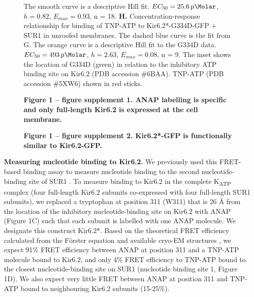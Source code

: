 \documentclass[10pt,lineno, doublespacing]{elife_modified}
\begin{document}
\begin{figure}
\begin{fullwidth}
{The smooth curve is a descriptive Hill fit.
$EC_{50} = \SI{25.6}{\micro\Molar}$, $h = 0.82$, $E_{max} = 0.93$, n = 18.
\textbf{H.}
Concentration-response relationship for binding of TNP-ATP to Kir6.2*-G334D-GFP + SUR1 in unroofed membranes.
The dashed blue curve is the fit from G. The orange curve is a descriptive Hill fit to the G334D data.
$EC_{50} = \SI{493}{\micro\Molar}$, $h = 2.63$, $E_{max} = 0.08$, n = 9.
The inset shows the location of G334D (green) in relation to the inhibitory ATP binding site on Kir6.2 (PDB accession \#6BAA).
TNP-ATP (PDB accession \#5XW6) shown in red sticks.
}
\raggedright
\textbf{\small Figure 1 -- figure supplement 1. ANAP labelling is specific and only full-length Kir6.2 is expressed at the cell membrane.}

\textbf{\small Figure 1 -- figure supplement 2. Kir6.2*-GFP is functionally similar to Kir6.2-GFP.}
\end{fullwidth}
\end{figure}

\textbf{Measuring nucleotide binding to Kir6.2.}
We previously used this FRET-based binding assay to measure nucleotide binding to the second nucleotide-binding site of SUR1 \citep{RN80}.
To measure binding to Kir6.2 in the complete K\textsubscript{ATP} complex (four full-length Kir6.2 subunits co-expressed with four full-length SUR1 subunits), we replaced a tryptophan at position 311 (W311) that is 26 \si{\angstrom} from the location of the inhibitory nucleotide-binding site on Kir6.2 with ANAP (Figure 1C) such that each subunit is labelled with one ANAP molecule.
We designate this construct Kir6.2*.
Based on the theoretical FRET efficiency calculated from the Förster equation and available cryo-EM structures \citep{RN6, RN113}, we expect 91\% FRET efficiency between ANAP at position 311 and a TNP-ATP molecule bound to Kir6.2, and only 4\% FRET efficiency to TNP-ATP bound to the closest nucleotide-binding site on SUR1 (nucleotide binding site 1, Figure 1D).
We also expect very little FRET between ANAP at position 311 and TNP-ATP bound to neighbouring Kir6.2 subunits (15-25\%).
\end{document}
